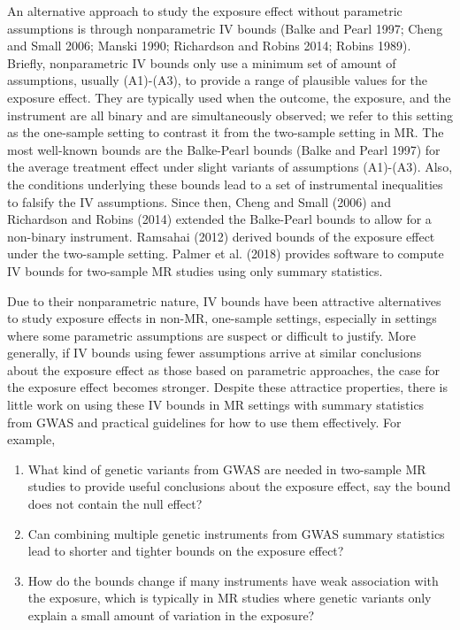 \documentclass[
]{article}
\theoremstyle{plain}
\begin{document}
An alternative approach to study the exposure effect without parametric assumptions is through nonparametric IV bounds (Balke and Pearl 1997; Cheng and Small 2006; Manski 1990; Richardson and Robins 2014; Robins 1989). Briefly, nonparametric IV bounds only use a minimum set of amount of assumptions, usually (A1)-(A3), to provide a range of plausible values for the exposure effect. They are typically used when the outcome, the exposure, and the instrument are all binary and are simultaneously observed; we refer to this setting as the one-sample setting to contrast it from the two-sample setting in MR. The most well-known bounds are the Balke-Pearl bounds (Balke and Pearl 1997) for the average treatment effect under slight variants of assumptions (A1)-(A3). Also, the conditions underlying these bounds lead to a set of instrumental inequalities to falsify the IV assumptions. Since then, Cheng and Small (2006) and Richardson and Robins (2014) extended the Balke-Pearl bounds to allow for a non-binary instrument. Ramsahai (2012) derived bounds of the exposure effect under the two-sample setting. Palmer et al. (2018) provides software to compute IV bounds for two-sample MR studies using only summary statistics.

Due to their nonparametric nature, IV bounds have been attractive alternatives to study exposure effects in non-MR, one-sample settings, especially in settings where some parametric assumptions are suspect or difficult to justify. More generally, if IV bounds using fewer assumptions arrive at similar conclusions about the exposure effect as those based on parametric approaches, the case for the exposure effect becomes stronger. Despite these attractice properties, there is little work on using these IV bounds in MR settings with summary statistics from GWAS and practical guidelines for how to use them effectively. For example,

\begin{enumerate}
\item What kind of genetic variants from GWAS are needed in two-sample MR studies to provide useful conclusions about the exposure effect, say the bound does not contain the null effect?
\item Can combining multiple genetic instruments from GWAS summary statistics lead to shorter and tighter bounds on the exposure effect? 
\item How do the bounds change if many instruments have weak association with the exposure, which is typically in MR studies where genetic variants only explain a small amount of variation in the exposure? 
\end{enumerate}
\end{document}
